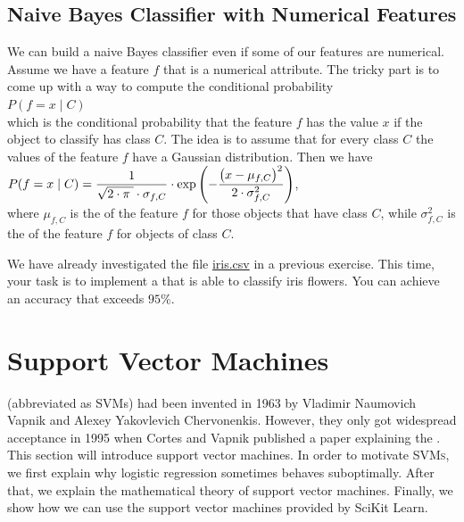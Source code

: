 \subsection{Naive Bayes Classifier with Numerical Features}
We can build a naive Bayes classifier even if some of our features are numerical.  Assume we have a feature $f$
that is a numerical attribute.  The tricky part is to come up with a way to compute the conditional probability
\\[0.2cm]
\hspace*{1.3cm}
$P(f = x \mid C)$
\\[0.2cm]
which is the conditional probability that the feature $f$ has the value $x$ if the object to classify has class
$C$.  The idea is to assume that for every class $C$ the values of the feature $f$ have a Gaussian
distribution.  Then we have
\\[0.2cm]
\hspace*{1.3cm}
$\displaystyle P(f = x \mid C) = \frac{1}{\sqrt{2\cdot\pi\;} \cdot \sigma_{f,C}} \cdot \exp\left(-\frac{\bigl(x-\mu_{f,C}\bigr)^2}{2 \cdot \sigma_{f,C}^2}\right)$,
\\[0.2cm]
where $\mu_{f,C}$ is the  of the feature $f$ for those objects that have class $C$, while
$\sigma_{f,C}^2$ is the  of the feature $f$ for objects of class $C$.

\exercise
We have already investigated the file
\href{https://github.com/karlstroetmann/Artificial-Intelligence/blob/master/Python/iris.csv}{iris.csv}
in a previous exercise.   This time, your task is to implement a  that is able to
classify iris flowers.  You can achieve an accuracy that exceeds $95\%$.
\eox

\section{Support Vector Machines}
 (abbreviated as \textsc{SVM}s) had been invented in 1963 by Vladimir
Naumovich Vapnik and Alexey Yakovlevich Chervonenkis.   However, they only got widespread acceptance in 1995
when Cortes and Vapnik published a paper explaining the  \cite{cortes:1995}.  This section will introduce
support vector machines.  In order to motivate \textsc{SVMs}, we first explain why logistic regression
sometimes behaves suboptimally.  After that, we explain the mathematical theory of support vector machines.
Finally, we show how we can use the support vector machines provided by SciKit Learn.

